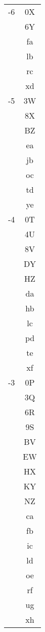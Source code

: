 \documentclass[11pt,a4paper]{scrarticle}
\theoremstyle{definition}
\begin{document}
\begin{longtable}{|c|c|}
    \hline
    -6         & 0X              \\ & 6Y \\ & fa \\ & lb \\ & rc \\ & xd \\
    \hline
    -5         & 3W              \\ & 8X \\ & BZ \\ & ea \\ & jb \\ & oc \\ & td \\ & ye \\
    \hline
    -4         & 0T              \\ & 4U \\ & 8V \\ & DY \\ & HZ \\ & da \\ & hb \\ & lc \\ & pd \\ & te \\ & xf \\
    \hline
    -3         & 0P              \\ & 3Q \\ & 6R \\ & 9S \\ & BV \\ & EW \\ & HX \\ & KY \\ & NZ \\ & ca \\ & fb \\ & ic \\ & ld \\ & oe \\ & rf \\ & ug \\ & xh \\
    \hline

\end{longtable}
\end{document}
